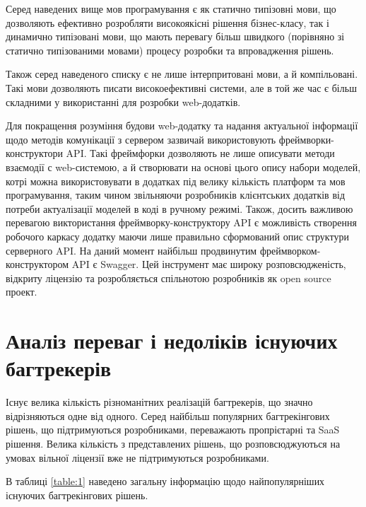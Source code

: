 \documentclass[../main.tex]{subfiles}
\begin{document}
Серед наведених вище мов програмування є як статично типізовні мови, що дозволяють ефективно розробляти високоякісні рішення бізнес-класу, так і динамично типізовані мови, що мають перевагу більш швидкого (порівняно зі статично типізованими мовами) процесу розробки та впровадження рішень.

Також серед наведеного списку є не лише інтерпритовані мови, а й компільовані. Такі мови дозволяють писати високоефективні системи, але в той же час є більш складними у використанні для розробки web-додатків.

Для покращення розуміння будови web-додатку та надання актуальної інформації щодо методів комунікації з сервером зазвичай використовують фреймворки-конструктори API. Такі фреймфорки дозволяють не лише описувати методи взаємодії с web-системою, а й створювати на основі цього опису набори моделей, котрі можна використовувати в додатках під велику кількість платформ та мов програмування, таким чином звільняючи розробників клієнтських додатків від потреби актуалізації моделей в коді в ручному режимі. Також, досить важливою перевагою виктористання фреймворку-конструктору API є можливість створення робочого каркасу додатку маючи лише правильно сформований опис структури серверного API. На даний момент найбільш продвинутим фреймворком-конструктором API є Swagger. Цей інструмент має широку розповсюдженість, відкриту ліцензію та розробляється спільнотою розробників як open source проект.

\section{Аналіз переваг і недоліків існуючих багтрекерів}

Існує велика кількість різноманітних реалізацій багтрекерів, що значно відрізняються одне від одного. Серед найбільш популярних багтрекінгових рішень, що підтримуються розробниками, переважають пропрієтарні та SaaS рішення. Велика кількість з представлених рішень, що розповсюджуються на умовах вільної ліцензії вже не підтримуються розробниками.

В таблиці \ref{table:1} наведено загальну інформацію щодо найпопулярніших існуючих багтрекінгових рішень.
\end{document}
